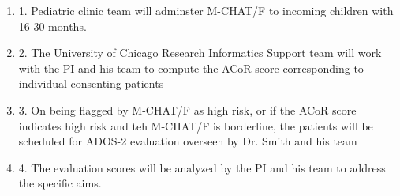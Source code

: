 \documentclass[onecolumn, compsoc,11pt]{IEEEtran}
\def\ZERO{ACoR\xspace}
\begin{document}
\begin{enumerate} 
[label=$\square$, leftmargin=0pt,
labelindent=0em, topsep=0.1em, labelsep=*, itemsep=.5em,itemindent=1em]
 \item 1. Pediatric clinic team  will  adminster  M-CHAT/F to incoming children with 16-30 months.
\item 2. The University of Chicago Research Informatics Support team will work with the PI and his team to
  compute the \ZERO score corresponding to individual consenting patients
\item 3. On being flagged by M-CHAT/F  as high risk, or if the \ZERO score indicates high risk and teh M-CHAT/F is borderline,  the patients will be scheduled for ADOS-2 evaluation overseen by Dr. Smith and his team
\item 4. The evaluation scores will be analyzed by the PI and his  team to address the specific aims.
\end{enumerate}
\end{document}
